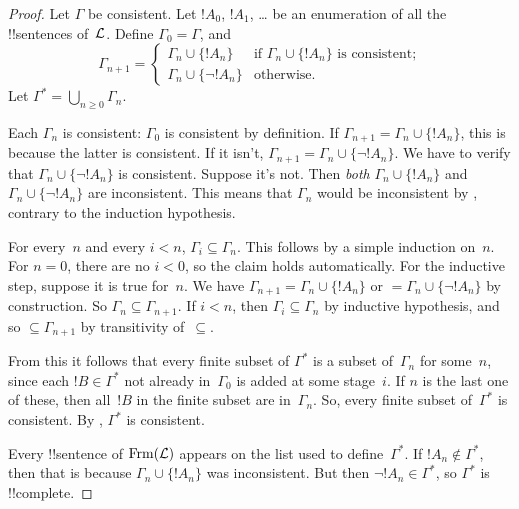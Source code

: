 \documentclass[../../../include/open-logic-section]{subfiles}
\begin{document}
\begin{proof}
Let $\Gamma$ be consistent.  Let $!A_0$, $!A_1$,
\dots{} be an enumeration of all the !!{sentence}s of~$\Lang L$.
Define $\Gamma_0 = \Gamma$, and
\[
\Gamma_{n+1} =
\begin{cases}
\Gamma_n \cup \{ !A_n \} & \textrm{if $\Gamma_n \cup \{!A_n\}$ is
  consistent;} \\
\Gamma_n \cup \{ \lnot !A_n \} & \textrm{otherwise.}
\end{cases}
\]
Let $\Gamma^* = \bigcup_{n \geq 0} \Gamma_n$.

Each $\Gamma_n$ is consistent: $\Gamma_0$ is consistent by definition.
If $\Gamma_{n+1} = \Gamma_n \cup \{!A_n\}$, this is because the latter
is consistent.  If it isn't, $\Gamma_{n+1} = \Gamma_n \cup \{\lnot
!A_n\}$. We have to verify that $\Gamma_n \cup \{\lnot !A_n\}$ is
consistent. Suppose it's not. Then \emph{both} $\Gamma_n \cup
\{!A_n\}$ and $\Gamma_n \cup \{\lnot !A_n\}$ are inconsistent.  This
means that $\Gamma_n$ would be inconsistent by
,
contrary to the induction hypothesis.

For every~$n$ and every $i < n$, $\Gamma_i \subseteq \Gamma_n$. This
follows by a simple induction on~$n$. For $n=0$, there are no $i < 0$,
so the claim holds automatically.  For the inductive step, suppose it
is true for~$n$. We have $\Gamma_{n+1} = \Gamma_n \cup \{!A_n\}$ or $=
\Gamma_n \cup \{\lnot !A_n\}$ by construction. So $\Gamma_n \subseteq
\Gamma_{n+1}$. If $i < n$, then $\Gamma_i \subseteq \Gamma_n$ by
inductive hypothesis, and so $\subseteq \Gamma_{n+1}$ by transitivity
of~$\subseteq$.

From this it follows that every finite subset of $\Gamma^*$ is a
subset of~$\Gamma_n$ for some~$n$, since each $!B \in \Gamma^*$ not
already in~$\Gamma_0$ is added at some stage~$i$. If $n$ is the last
one of these, then all~$!B$ in the finite subset are
in~$\Gamma_n$. So, every finite subset of~$\Gamma^*$ is consistent. By
, $\Gamma^*$ is
  consistent.

Every !!{sentence} of $\Frm[L]$ appears on the list used to
define~$\Gamma^*$. If $!A_n \notin \Gamma^*$, then that is because
$\Gamma_n \cup \{!A_n\}$ was inconsistent.  But then $\lnot !A_n
\in \Gamma^*$, so $\Gamma^*$ is !!{complete}.
\end{proof}
\end{document}
